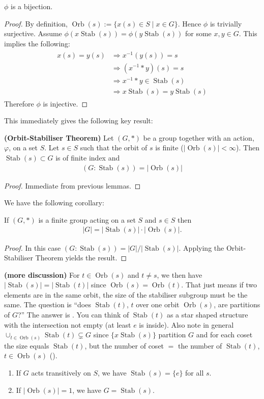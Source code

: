 \documentclass{article}
\newcommand{\bfs}[1]{\textbf{({#1}) }}
\newcommand{\Stab}{\operatorname{Stab}}
\newcommand{\Orb}{\operatorname{Orb}}
\begin{document}
\begin{lema}\label{lem:bi_g_stab}
$\phi$ is a bijection.
\end{lema} 
\begin{proof}
By definition, $\operatorname{Orb}(s):=\{x(s) \in S \mid x \in G\}$. Hence $\phi$ is trivially surjective. Assume $\phi(x \Stab(s))=\phi(y \Stab(s))$ for some $x, y \in G$. This implies the following:
\begin{align*}
\begin{aligned}
x(s)=y(s) & \Rightarrow x^{-1}(y(s))=s \\
& \Rightarrow\left(x^{-1} * y\right)(s)=s \\
& \Rightarrow x^{-1} * y \in \Stab(s) \\
& \Rightarrow x \Stab(s)=y \Stab(s)
\end{aligned}
\end{align*}
Therefore $\phi$ is injective.
\end{proof} 
This immediately gives the following key result:
\begin{thma}{\bfs{Orbit-Stabiliser Theorem}}
 Let $(G, *)$ be a group together with an action, $\varphi$, on a set $S$. Let $s \in S$ such that the orbit of $s$ is finite ($|\Orb(s)|<\infty$). Then $\Stab(s) \subset G$ is of finite index and
\begin{align*}
(G: \Stab(s))=|\Orb(s)|
\end{align*}
\end{thma}
\begin{proof}
Immediate from previous lemmas.
\end{proof} 
We have the following corollary:
\begin{cora}
If $(G, *)$ is a finite group acting on a set $S$ and $s \in S$ then
\begin{align*}
|G|=|\Stab(s)| \cdot|\Orb(s)|.
\end{align*}
\end{cora} 
\begin{proof}
In this case $(G: \Stab(s))=|G| / |\Stab(s) |$. Applying the Orbit-Stabiliser Theorem yields the result.
\end{proof}
\begin{rema}\bfs{more discussion}
For $t\in \Orb(s)$ and $t\ne s$, we then have $|\Stab(s)|=|\Stab(t)|$ since $\Orb(s)=\Orb(t)$. That just means if two elements are in the same orbit, the size of the stabiliser subgroup must be the same. The question is ``does $\Stab(t)$, $t$ over one orbit $\Orb(s)$, are partitions of $G$?'' The answer is . You can think of $\Stab(t)$ as a star shaped structure with the intersection not empty (at least $e$ is inside). Also note  in general $\cup_{t\in \Orb(s)} \Stab(t)\subsetneq G$ since  $\{x\Stab(s)\}$ partition $G$ and for each coset the size equals $\Stab(t)$, but the number of coset $=$ the number of $\Stab(t)$, $t\in \Orb(s)$ ().
\begin{enumerate}[$\star$]
    \item  If $G$ acts transitively on $S$, we have $\Stab(s)=\{e\}$ for all $s$.
    \item  If $|\Orb(s)|=1$, we have $G=\Stab(s)$.
\end{enumerate}

\end{rema}
\end{document}
